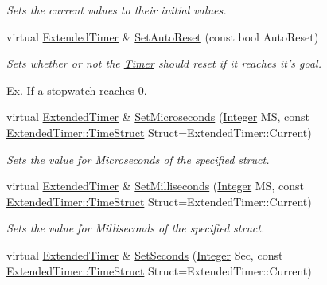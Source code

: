 \begin{DoxyCompactItemize}
\begin{DoxyCompactList}\small\item\em Sets the current values to their initial values. \item\end{DoxyCompactList}\item 
virtual \hyperlink{classphys_1_1ExtendedTimer}{ExtendedTimer} \& \hyperlink{classphys_1_1ExtendedTimer_aa16dfa7e855f9b8b55c85058cb24d03a}{SetAutoReset} (const bool AutoReset)
\begin{DoxyCompactList}\small\item\em Sets whether or not the \hyperlink{classphys_1_1Timer}{Timer} should reset if it reaches it's goal. \par
 Ex. If a stopwatch reaches 0. \item\end{DoxyCompactList}\item 
virtual \hyperlink{classphys_1_1ExtendedTimer}{ExtendedTimer} \& \hyperlink{classphys_1_1ExtendedTimer_a86f1e5d470565a2dda78b66aca47d667}{SetMicroseconds} (\hyperlink{namespacephys_a7f09bf5585b2bb97613cd9aad4273a81}{Integer} MS, const \hyperlink{classphys_1_1ExtendedTimer_a0f316e9347d1c118a157cc3c737c554b}{ExtendedTimer::TimeStruct} Struct=ExtendedTimer::Current)
\begin{DoxyCompactList}\small\item\em Sets the value for Microseconds of the specified struct. \item\end{DoxyCompactList}\item 
virtual \hyperlink{classphys_1_1ExtendedTimer}{ExtendedTimer} \& \hyperlink{classphys_1_1ExtendedTimer_ab64ddc2dc49d4daf9b0e5a33dc9dc68a}{SetMilliseconds} (\hyperlink{namespacephys_a7f09bf5585b2bb97613cd9aad4273a81}{Integer} MS, const \hyperlink{classphys_1_1ExtendedTimer_a0f316e9347d1c118a157cc3c737c554b}{ExtendedTimer::TimeStruct} Struct=ExtendedTimer::Current)
\begin{DoxyCompactList}\small\item\em Sets the value for Milliseconds of the specified struct. \item\end{DoxyCompactList}\item 
virtual \hyperlink{classphys_1_1ExtendedTimer}{ExtendedTimer} \& \hyperlink{classphys_1_1ExtendedTimer_ad9303e618cb0ea171441d595eb5a3e55}{SetSeconds} (\hyperlink{namespacephys_a7f09bf5585b2bb97613cd9aad4273a81}{Integer} Sec, const \hyperlink{classphys_1_1ExtendedTimer_a0f316e9347d1c118a157cc3c737c554b}{ExtendedTimer::TimeStruct} Struct=ExtendedTimer::Current)

\end{DoxyCompactItemize}
